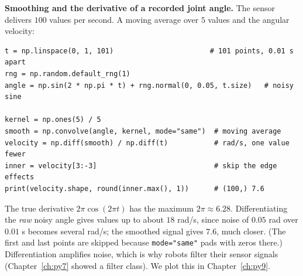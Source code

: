 \begin{example}
\textbf{Smoothing and the derivative of a recorded joint angle.} The sensor delivers $100$ values per second. A moving average over $5$ values and the angular velocity:
\begin{verbatim}
t = np.linspace(0, 1, 101)                       # 101 points, 0.01 s apart
rng = np.random.default_rng(1)
angle = np.sin(2 * np.pi * t) + rng.normal(0, 0.05, t.size)   # noisy sine

kernel = np.ones(5) / 5
smooth = np.convolve(angle, kernel, mode="same")  # moving average
velocity = np.diff(smooth) / np.diff(t)           # rad/s, one value fewer
inner = velocity[3:-3]                            # skip the edge effects
print(velocity.shape, round(inner.max(), 1))      # (100,) 7.6
\end{verbatim}
The true derivative $2\pi\cos(2\pi t)$ has the maximum $2\pi\approx6.28$. Differentiating the \emph{raw} noisy angle gives values up to about $18$ rad/s, since noise of $0.05$ rad over $0.01$ s becomes several rad/s; the smoothed signal gives $7.6$, much closer. (The first and last points are skipped because \texttt{mode="same"} pads with zeros there.) Differentiation amplifies noise, which is why robots filter their sensor signals (Chapter~\ref{ch:py7} showed a filter class). We plot this in Chapter~\ref{ch:py9}.
\end{example}

